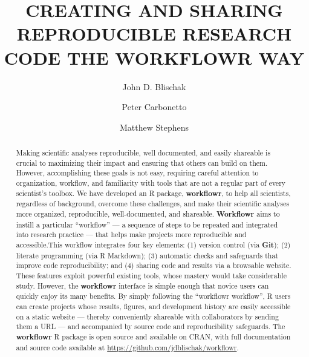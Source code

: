 \documentclass[9pt,a4paper]{extarticle}
\begin{document}
\pagestyle{front}

\title{CREATING AND SHARING REPRODUCIBLE RESEARCH CODE THE WORKFLOWR
WAY}

\author[1]{John D. Blischak}

\author[1,2]{Peter Carbonetto}

\author[1,3]{Matthew Stephens}




\maketitle

\thispagestyle{front}

\begin{abstract}


Making scientific analyses reproducible, well documented, and easily
shareable is crucial to maximizing their impact and ensuring that others
can build on them. However, accomplishing these goals is not easy,
requiring careful attention to organization, workflow, and familiarity
with tools that are not a regular part of every scientist's toolbox. We
have developed an R package, \textbf{workflowr}, to help all scientists,
regardless of background, overcome these challenges, and make their
scientific analyses more organized, reproducible, well-documented, and
shareable. \textbf{Workflowr} aims to instill a particular ``workflow'' --- a
sequence of steps to be repeated and integrated into research practice
--- that helps make projects more reproducible and accessible.This
workflow integrates four key elements: (1) version control (via \textbf{Git});
(2) literate programming (via R Markdown); (3) automatic checks and
safeguards that improve code reproducibility; and (4) sharing code and
results via a browsable website. These features exploit powerful
existing tools, whose mastery would take considerable study. However,
the \textbf{workflowr} interface is simple enough that novice users can quickly
enjoy its many benefits. By simply following the ``workflowr workflow'',
R users can create projects whose results, figures, and development
history are easily accessible on a static website --- thereby
conveniently shareable with collaborators by sending them a URL --- and
accompanied by source code and reproducibility safeguards. The \textbf{workflowr}
R package is open source and available on CRAN, with full documentation
and source code available at
\url{https://github.com/jdblischak/workflowr}.

\end{abstract}
\end{document}
